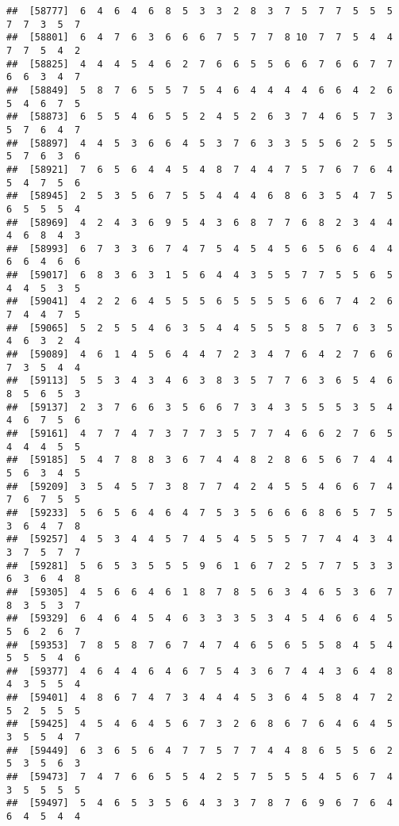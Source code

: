 \documentclass[
]{book}
\begin{document}
\begin{verbatim}
##  [58777]  6  4  6  4  6  8  5  3  3  2  8  3  7  5  7  7  5  5  5  7  7  3  5  7
##  [58801]  6  4  7  6  3  6  6  6  7  5  7  7  8 10  7  7  5  4  4  7  7  5  4  2
##  [58825]  4  4  4  5  4  6  2  7  6  6  5  5  6  6  7  6  6  7  7  6  6  3  4  7
##  [58849]  5  8  7  6  5  5  7  5  4  6  4  4  4  4  6  6  4  2  6  5  4  6  7  5
##  [58873]  6  5  5  4  6  5  5  2  4  5  2  6  3  7  4  6  5  7  3  5  7  6  4  7
##  [58897]  4  4  5  3  6  6  4  5  3  7  6  3  3  5  5  6  2  5  5  5  7  6  3  6
##  [58921]  7  6  5  6  4  4  5  4  8  7  4  4  7  5  7  6  7  6  4  5  4  7  5  6
##  [58945]  2  5  3  5  6  7  5  5  4  4  4  6  8  6  3  5  4  7  5  6  5  5  5  4
##  [58969]  4  2  4  3  6  9  5  4  3  6  8  7  7  6  8  2  3  4  4  4  6  8  4  3
##  [58993]  6  7  3  3  6  7  4  7  5  4  5  4  5  6  5  6  6  4  4  6  6  4  6  6
##  [59017]  6  8  3  6  3  1  5  6  4  4  3  5  5  7  7  5  5  6  5  4  4  5  3  5
##  [59041]  4  2  2  6  4  5  5  5  6  5  5  5  5  6  6  7  4  2  6  7  4  4  7  5
##  [59065]  5  2  5  5  4  6  3  5  4  4  5  5  5  8  5  7  6  3  5  4  6  3  2  4
##  [59089]  4  6  1  4  5  6  4  4  7  2  3  4  7  6  4  2  7  6  6  7  3  5  4  4
##  [59113]  5  5  3  4  3  4  6  3  8  3  5  7  7  6  3  6  5  4  6  8  5  6  5  3
##  [59137]  2  3  7  6  6  3  5  6  6  7  3  4  3  5  5  5  3  5  4  4  6  7  5  6
##  [59161]  4  7  7  4  7  3  7  7  3  5  7  7  4  6  6  2  7  6  5  4  4  4  5  5
##  [59185]  5  4  7  8  8  3  6  7  4  4  8  2  8  6  5  6  7  4  4  5  6  3  4  5
##  [59209]  3  5  4  5  7  3  8  7  7  4  2  4  5  5  4  6  6  7  4  7  6  7  5  5
##  [59233]  5  6  5  6  4  6  4  7  5  3  5  6  6  6  8  6  5  7  5  3  6  4  7  8
##  [59257]  4  5  3  4  4  5  7  4  5  4  5  5  5  7  7  4  4  3  4  3  7  5  7  7
##  [59281]  5  6  5  3  5  5  5  9  6  1  6  7  2  5  7  7  5  3  3  6  3  6  4  8
##  [59305]  4  5  6  6  4  6  1  8  7  8  5  6  3  4  6  5  3  6  7  8  3  5  3  7
##  [59329]  6  4  6  4  5  4  6  3  3  3  5  3  4  5  4  6  6  4  5  5  6  2  6  7
##  [59353]  7  8  5  8  7  6  7  4  7  4  6  5  6  5  5  8  4  5  4  5  5  5  4  6
##  [59377]  4  6  4  4  6  4  6  7  5  4  3  6  7  4  4  3  6  4  8  4  3  5  5  4
##  [59401]  4  8  6  7  4  7  3  4  4  4  5  3  6  4  5  8  4  7  2  5  2  5  5  5
##  [59425]  4  5  4  6  4  5  6  7  3  2  6  8  6  7  6  4  6  4  5  3  5  5  4  7
##  [59449]  6  3  6  5  6  4  7  7  5  7  7  4  4  8  6  5  5  6  2  5  3  5  6  3
##  [59473]  7  4  7  6  6  5  5  4  2  5  7  5  5  5  4  5  6  7  4  3  5  5  5  5
##  [59497]  5  4  6  5  3  5  6  4  3  3  7  8  7  6  9  6  7  6  4  6  4  5  4  4

\end{verbatim}
\end{document}
